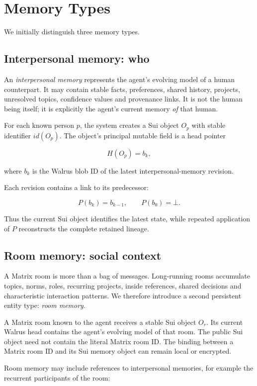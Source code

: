 \documentclass[11pt]{article}
\begin{document}
\section{Memory Types}

We initially distinguish three memory types.

\subsection{Interpersonal memory: who}

An \emph{interpersonal memory} represents the agent's evolving model of a human counterpart. It may contain stable facts, preferences, shared history, projects, unresolved topics, confidence values and provenance links. It is not the human being itself; it is explicitly the agent's current memory \emph{of} that human.

For each known person $p$, the system creates a Sui object $O_p$ with stable identifier $id(O_p)$. The object's principal mutable field is a head pointer

\[
H(O_p) = b_k,
\]

where $b_k$ is the Walrus blob ID of the latest interpersonal-memory revision.

Each revision contains a link to its predecessor:

\[
P(b_k)=b_{k-1}, \qquad P(b_0)=\bot.
\]

Thus the current Sui object identifies the latest state, while repeated application of $P$ reconstructs the complete retained lineage.

\subsection{Room memory: social context}

A Matrix room is more than a bag of messages. Long-running rooms accumulate topics, norms, roles, recurring projects, inside references, shared decisions and characteristic interaction patterns. We therefore introduce a second persistent entity type: \emph{room memory}.

A Matrix room known to the agent receives a stable Sui object $O_r$. Its current Walrus head contains the agent's evolving model of that room. The public Sui object need not contain the literal Matrix room ID. The binding between a Matrix room ID and its Sui memory object can remain local or encrypted.

Room memory may include references to interpersonal memories, for example the recurrent participants of the room:
\end{document}
